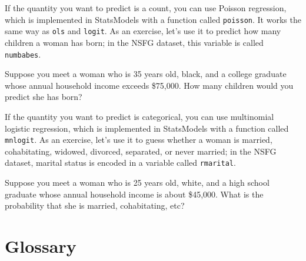 \documentclass[12pt]{book}
\begin{document}
\begin{exercise}
If the quantity you want to predict is a count, you can use Poisson
regression, which is implemented in StatsModels with a function called
{\tt poisson}.  It works the same way as {\tt ols} and {\tt logit}.
As an exercise, let's use it to predict how many children a woman
has born; in the NSFG dataset, this variable is called {\tt numbabes}.

Suppose you meet a woman who is 35 years old, black, and a college
graduate whose annual household income exceeds \$75,000.  How many
children would you predict she has born?
\end{exercise}


\begin{exercise}
If the quantity you want to predict is categorical, you can use
multinomial logistic regression, which is implemented in StatsModels
with a function called {\tt mnlogit}.  As an exercise, let's use it to
guess whether a woman is married, cohabitating, widowed, divorced,
separated, or never married; in the NSFG dataset, marital status is
encoded in a variable called {\tt rmarital}.

Suppose you meet a woman who is 25 years old, white, and a high
school graduate whose annual household income is about \$45,000.
What is the probability that she is married, cohabitating, etc?
\end{exercise}




\section{Glossary}
\end{document}
